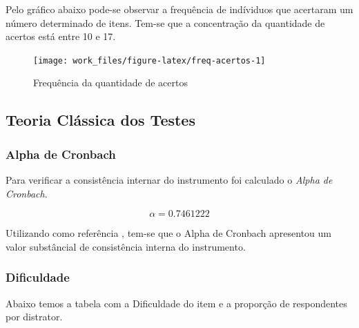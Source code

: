 \documentclass[]{article}
\begin{document}
Pelo gráfico abaixo pode-se observar a frequência de indíviduos que
acertaram um número determinado de itens. Tem-se que a concentração da
quantidade de acertos está entre 10 e 17.

\begin{figure}[H]

{\centering \texttt{[image: work\_files/figure-latex/freq-acertos-1]} 

}

\caption{Frequência da quantidade de acertos}\label{fig:freq-acertos}
\end{figure}

\subsection{Teoria Clássica dos
Testes}\label{teoria-classica-dos-testes}

\subsubsection{Alpha de Cronbach}\label{alpha-de-cronbach}

Para verificar a consistência internar do instrumento foi calculado o
\emph{Alpha de Cronbach}.

\[\alpha = 0.7461222\]

Utilizando como referência \citet{landis}, tem-se que o Alpha de
Cronbach apresentou um valor substâncial de consistência interna do
instrumento.

\subsubsection{Dificuldade}\label{dificuldade}

Abaixo temos a tabela com a Dificuldade do item e a proporção de
respondentes por distrator.
\end{document}
